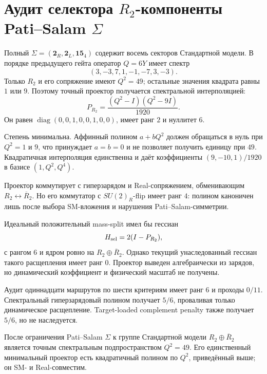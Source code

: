 \chapter{Аудит селектора \texorpdfstring{$R_2$}{R2}-компоненты
Pati--Salam \texorpdfstring{$\Sigma$}{Sigma}}
\label{ch:v10-h15-r2-pati-salam-sigma-selector-audit}

Полный $\Sigma=(\mathbf2_R,\mathbf2_L,\mathbf{15}_4)$ содержит восемь
секторов Стандартной модели. В порядке предыдущего гейта оператор
$Q=6Y$ имеет спектр
\begin{equation}
 (3,-3,7,1,-1,-7,3,-3).
\end{equation}
Только $R_2$ и его сопряжение имеют $Q^2=49$; остальные значения квадрата
равны $1$ или $9$. Поэтому точный проектор получается спектральной
интерполяцией:
\begin{equation}
 \boxed{P_{R_2}=\frac{(Q^2-I)(Q^2-9I)}{1920}}.
\end{equation}
Он равен $\operatorname{diag}(0,0,1,0,0,1,0,0)$, имеет ранг $2$ и
нуллитет $6$.

Степень минимальна. Аффинный полином $a+bQ^2$ должен обращаться в нуль при
$Q^2=1$ и $9$, что принуждает $a=b=0$ и не позволяет получить единицу при
$49$. Квадратичная интерполяция единственна и даёт коэффициенты
$(9,-10,1)/1920$ в базисе $(1,Q^2,Q^4)$.

Проектор коммутирует с гиперзарядом и Real-сопряжением, обменивающим
$R_2\leftrightarrow\overline R_2$. Но его коммутатор с $SU(2)_R$-flip
имеет ранг $4$: полином каноничен лишь после выбора SM-вложения и нарушения
Pati--Salam-симметрии.

Идеальный положительный mass-split имел бы гессиан
\begin{equation}
 H_{\rm sel}=2(I-P_{R_2}),
\end{equation}
с рангом $6$ и ядром ровно на $R_2\oplus\overline R_2$. Однако текущий
унаследованный гессиан такого расщепления имеет ранг $0$. Проектор выведен
алгебраически из зарядов, но динамический коэффициент и физический масштаб
не получены.

Аудит одиннадцати маршрутов по шести критериям имеет ранг $6$ и проходы
$0/11$. Спектральный гиперзарядовый полином получает $5/6$, проваливая
только динамическое расщепление. Target-loaded complement penalty также
получает $5/6$, но не наследуется.

\begin{theorem}
После ограничения Pati--Salam $\Sigma$ к группе Стандартной модели
$R_2\oplus\overline R_2$ является точным спектральным подпространством
$Q^2=49$. Его единственный минимальный проектор есть квадратичный полином
по $Q^2$, приведённый выше; он SM- и Real-совместим.
\end{theorem}

